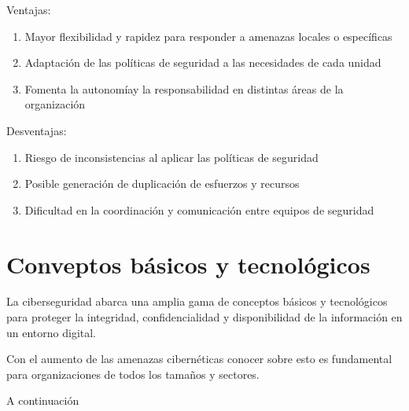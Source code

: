 \documentclass{article}
\begin{document}
Ventajas:

\begin{enumerate}
	\item Mayor flexibilidad y rapidez para responder a amenazas locales o específicas
	\item Adaptación de las políticas de seguridad a las necesidades de cada unidad
	\item Fomenta la autonomíay la responsabilidad en distintas áreas de la organización
\end{enumerate}

Desventajas:

\begin{enumerate}
	\item Riesgo de inconsistencias al aplicar las políticas de seguridad
	\item Posible generación de duplicación de esfuerzos y recursos
	\item Dificultad en la coordinación y comunicación entre equipos de seguridad
\end{enumerate}



\section{Conveptos básicos y tecnológicos}

La ciberseguridad abarca una amplia gama de conceptos básicos y tecnológicos
para proteger la integridad, confidencialidad y disponibilidad de la información
en un entorno digital.

Con el aumento de las amenazas cibernéticas conocer sobre esto es fundamental 
para organizaciones de todos los tamaños y sectores.

A continuación 
\end{document}
